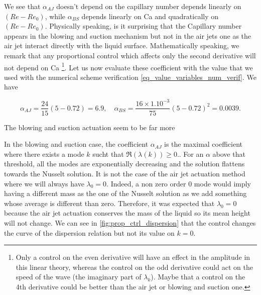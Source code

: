 \documentclass[12pt]{article}
\begin{document}
We see that $\alpha_{AJ}$ doesn't depend on the capillary number depends linearly on $(Re-Re_0)$, while $\alpha_{BS}$ depends linearly on Ca and quadratically on $(Re-Re_0)$. Physically speaking, is it surprising that the Capillary number appears in the blowing and suction mechanism but not in the air jets one as the air jet interact directly with the liquid surface. Mathematically speaking, we remark that any proportional control which affects only the second derivative will not depend on Ca \footnote{Only a control on the even derivative will have an effect in the amplitude in this linear theory, whereas the control on the odd derivative could act on the speed of the wave (the imaginary part of $\lambda_k$). Maybe that a control on the 4th derivative could be better than the air jet or blowing and suction one.}. Let us now evaluate these coefficient with the value that we used with the numerical scheme verification \eqref{eq_value_variables_num_verif}. We have 

$$\alpha_{AJ} = \frac{24}{15}(5-0.72) = 6.9, \quad \alpha_{BS} = \frac{16\times 1.10^{-3}}{75}(5-0.72)^2= 0.0039.$$

The blowing and suction actuation seem to be far more



In the blowing and suction case,  the coefficient $\alpha_{AJ}$ is the maximal coefficient where there exists a mode $k$ sucht that $\mathfrak{R}(\lambda(k)) \geq 0.$. For an $\alpha$ above that threshold, all the modes are exponentially decreasing and the solution flattens towards the Nusselt solution. It is not the case of the air jet actuation method where we will always have $\lambda_0=0.$ Indeed, a non zero order 0 mode would imply having a different mass as the one of the Nusselt solution as we add something whose average is different than zero. Therefore, it was expected that $\lambda_0 = 0$ because the air jet actuation conserves the mass of the liquid so its mean height will not change. We can see in \eqref{fig:prop_ctrl_dispersion} that the control changes the curve of the dispersion relation but not its value on $k=0$.
\\
\end{document}
